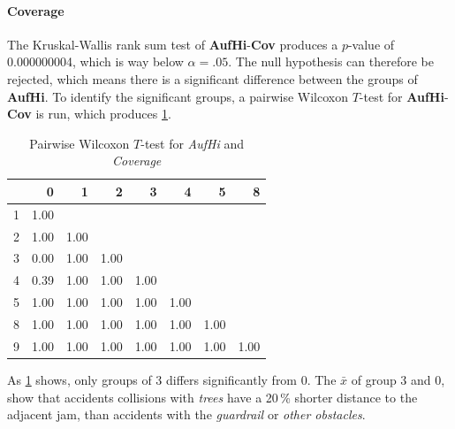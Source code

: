\paragraph{Coverage}
The Kruskal-Wallis rank sum test of \textbf{AufHi}-\textbf{Cov} produces a $p$-value of 0.000000004, which is way below $\alpha=.05$. The null hypothesis can therefore be rejected, which means there is a significant difference between the groups of \textbf{AufHi}. To identify the significant groups, a pairwise Wilcoxon $T$-test for \textbf{AufHi}-\textbf{Cov} is run, which produces \cref{tbl:wilcoxon_baysis_matched_AufHi_Cov}. 
\begin{table}[ht]
	\tiny
	\centering
    \begin{tabular}{rrrrrrrr}
        \toprule
        & 0 & 1 & 2 & 3 & 4 & 5 & 8 \\ 
        \midrule
        1 & 1.00 &  &  &  &  &  &  \\ 
        2 & 1.00 & 1.00 &  &  &  &  &  \\ 
        3 & 0.00 & 1.00 & 1.00 &  &  &  &  \\ 
        4 & 0.39 & 1.00 & 1.00 & 1.00 &  &  &  \\ 
        5 & 1.00 & 1.00 & 1.00 & 1.00 & 1.00 &  &  \\ 
        8 & 1.00 & 1.00 & 1.00 & 1.00 & 1.00 & 1.00 &  \\ 
        9 & 1.00 & 1.00 & 1.00 & 1.00 & 1.00 & 1.00 & 1.00 \\ 
        \bottomrule
      \end{tabular}
	\caption{Pairwise Wilcoxon $T$-test for \textit{AufHi} and \textit{Coverage}}
	\label{tbl:wilcoxon_baysis_matched_AufHi_Cov}
\end{table}
As \cref{tbl:wilcoxon_baysis_matched_AufHi_Cov} shows, only groups of 3 differs significantly from 0. The $\bar{x}$ of group 3 and 0, show that accidents collisions with \textit{trees} have a 20\,\% shorter distance to the adjacent jam, than accidents with the \textit{guardrail} or \textit{other obstacles}.
